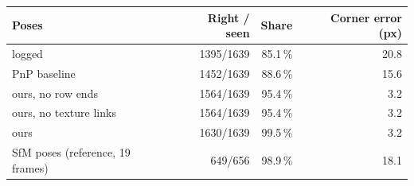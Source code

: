 \begin{tabular}{lrrr}
\toprule
Poses & Right / seen & Share & Corner error (px) \\
\midrule
logged & 1395/1639 & 85.1\,\% & 20.8 \\
PnP baseline & 1452/1639 & 88.6\,\% & 15.6 \\
ours, no row ends & 1564/1639 & 95.4\,\% & 3.2 \\
ours, no texture links & 1564/1639 & 95.4\,\% & 3.2 \\
ours & 1630/1639 & 99.5\,\% & 3.2 \\
SfM poses (reference, 19 frames) & 649/656 & 98.9\,\% & 18.1 \\
\bottomrule
\end{tabular}
